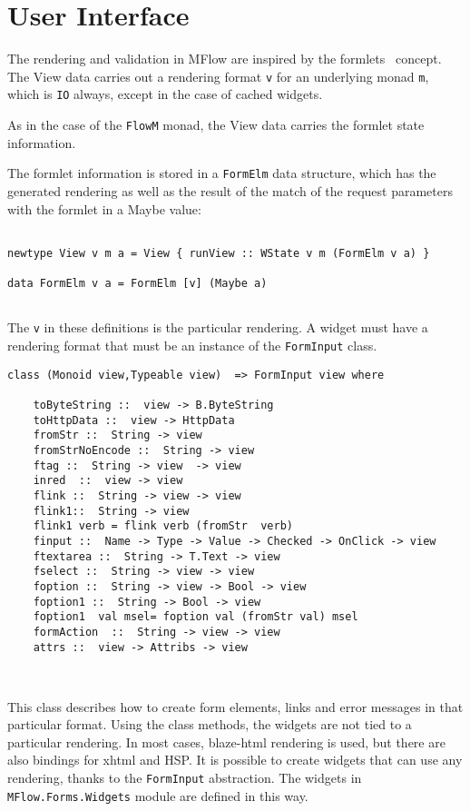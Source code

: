 \documentclass{tmr}
\begin{document}
\section{User Interface} 
The rendering and validation in MFlow are inspired by the  formlets~\cite{auth:formlets} concept. The View  data carries out a rendering format {\tt v} for an underlying monad {\tt m}, which is {\tt IO} always, except in the case of cached widgets.
 
As in the case of the {\tt FlowM} monad, the View data carries the formlet state information. 
 
The formlet information is stored in a {\tt FormElm} data structure, which has the generated rendering as well as the result of the match of the request parameters with the formlet in a Maybe value: 
{\tt 
 
\begin{verbatim} 
 
newtype View v m a = View { runView :: WState v m (FormElm v a) } 
 
data FormElm v a = FormElm [v] (Maybe a) 
 
\end{verbatim} 
 
} 
The {\tt v} in these definitions is the particular rendering.  A widget must have a rendering format that must be an instance of the {\tt FormInput} class. 
 
{\tt 
 
\begin{verbatim} 
class (Monoid view,Typeable view)  => FormInput view where 
 
    toByteString ::  view -> B.ByteString 
    toHttpData ::  view -> HttpData 
    fromStr ::  String -> view 
    fromStrNoEncode ::  String -> view 
    ftag ::  String -> view  -> view 
    inred  ::  view -> view 
    flink ::  String -> view -> view 
    flink1::  String -> view 
    flink1 verb = flink verb (fromStr  verb) 
    finput ::  Name -> Type -> Value -> Checked -> OnClick -> view 
    ftextarea ::  String -> T.Text -> view 
    fselect ::  String -> view -> view 
    foption ::  String -> view -> Bool -> view 
    foption1 ::  String -> Bool -> view 
    foption1  val msel= foption val (fromStr val) msel 
    formAction  ::  String -> view -> view 
    attrs ::  view -> Attribs -> view 
 
 
\end{verbatim} 
 
} 
 
This class describes how to create form elements, links and error 
messages in that particular format. Using the class methods, the 
widgets are not tied to a particular rendering. In most cases, blaze-html rendering is used, but there are also bindings for xhtml and HSP\@. It is possible to create widgets that can use any rendering, thanks to the {\tt FormInput} abstraction. The widgets in {\tt MFlow.Forms.Widgets} module are defined in this way. 
 
\end{document}

